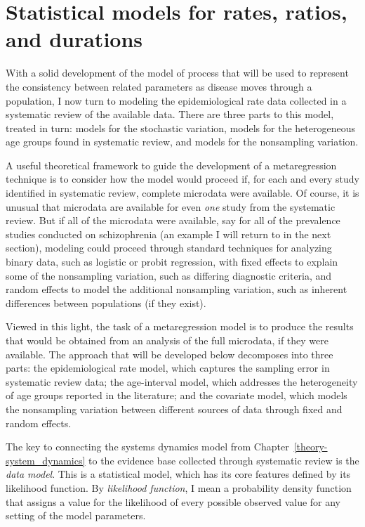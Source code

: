 \chapter{Statistical models for rates, ratios, and durations}
\label{theory-rate_model}

With a solid development of the model of process that will be used to
represent the consistency between related parameters as disease
moves through a population, I now turn to modeling the
epidemiological rate data collected in a systematic review of the
available data.  There are three parts to this model, treated in turn:
models for the stochastic variation, models for the heterogeneous age
groups found in systematic review, and models for the nonsampling
variation.

A useful theoretical framework to guide the development of
a metaregression technique is to consider how the model would proceed
if, for each and every study identified in systematic review, complete
microdata were available.  Of course, it is unusual that microdata are
available for even \emph{one} study from the systematic review.  But
if all of the microdata were available, say for all of the prevalence
studies conducted on schizophrenia (an example I will return to in
the next section), modeling could proceed through standard techniques
for analyzing binary data, such as logistic or probit regression, with
fixed effects to explain some of the nonsampling variation, such as
differing diagnostic criteria, and random effects to model the
additional nonsampling variation, such as inherent differences
between populations (if they exist).

Viewed in this light, the task of a metaregression model is to
produce the results that would be obtained from an analysis of the
full microdata, if they were available. The approach that will be
developed below decomposes into three parts: the epidemiological rate
model, which captures the sampling error in systematic review data;
the age-interval model, which addresses the heterogeneity of age
groups reported in the literature; and the covariate model, which
models the nonsampling variation between different sources of data
through fixed and random effects.

The key to connecting the systems dynamics model from
Chapter~\ref{theory-system_dynamics} to the evidence base collected
through systematic review is the \emph{data model}.  This is a
statistical model, which has its core features defined by its
likelihood function.  By \emph{likelihood function}, I mean a
probability density function that assigns a value for the likelihood
of every possible observed value for any setting of the model
parameters.

